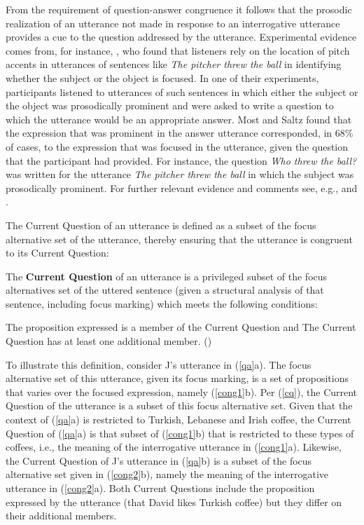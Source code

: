 \documentclass[11pt,fleqn]{article}
\newcommand{\6}{\mbox{$[\hspace*{-.6mm}[$}}
\newcommand{\9}{\mbox{$]\hspace*{-.6mm}]$}}
\begin{document}
From the requirement of question-answer congruence it follows that the prosodic realization of an utterance not made in response to an interrogative utterance provides a cue to the question addressed by the utterance. Experimental evidence comes from, for instance, \citealt{most-saltz79}, who found that listeners rely on the location of pitch accents in utterances of sentences like {\em The pitcher threw the ball} in identifying whether the subject or the object is focused. In one of their experiments, participants listened to utterances of such sentences in which either the subject or the object was prosodically prominent and were asked to write a question to which the utterance would be an appropriate answer. Most and Saltz found that the expression that was prominent in the answer utterance corresponded, in 68\% of cases, to the expression that was focused in the utterance, given the question that the participant had provided. For instance, the question {\em Who threw the ball?} was written for the utterance {\em The pitcher threw the ball} in which the subject was prosodically prominent. For further relevant evidence and comments see, e.g., \citealt{halliday67,birch-clifton1995} and \citealt{breen-etal10}. 

The Current Question of an utterance is defined as a subset of the focus alternative set of the utterance, thereby ensuring that the utterance is congruent to its Current Question:

\begin{exe} \ex\label{cq}  The
{\bf Current Question} of an utterance is a privileged subset of the focus
alternatives set of the uttered sentence (given a structural analysis of
that sentence, including focus marking) which meets the following
conditions:

\begin{xlist}
 The proposition expressed is a member of the Current Question and
 The Current Question has at least one additional member. \hfill (\citealt[194]{best-question})
\end{xlist}

\end{exe}

To illustrate this definition, consider J's utterance in (\ref{qa}a). The focus alternative set of this utterance, given its focus marking, is a set of propositions that varies over the focused expression, namely (\ref{cong1}b). Per (\ref{cq}), the Current Question of the utterance is a subset of this focus alternative set. Given that the context of (\ref{qa}a) is restricted to Turkish, Lebanese and Irish coffee, the Current Question of (\ref{qa}a) is that subset of (\ref{cong1}b) that is restricted to these types of coffees, i.e., the meaning of the interrogative utterance in (\ref{cong1}a). Likewise, the Current Question of J's utterance in (\ref{qa}b) is a subset of the focus alternative set given in (\ref{cong2}b), namely the meaning of the interrogative utterance in (\ref{cong2}a). Both Current Questions include the proposition expressed by the utterance (that David likes Turkish coffee) but they differ on their additional members.
\end{document}
